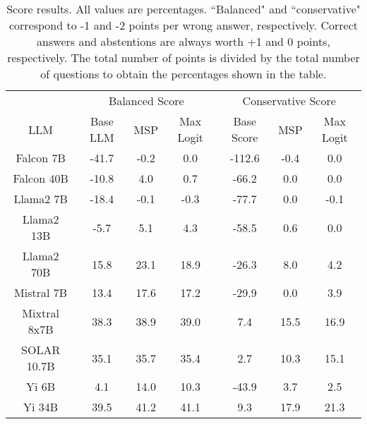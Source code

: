 \renewcommand\arraystretch{1.2}
\begin{table*}
\centering
\begin{tabular}{c|c|c|c|c|c|c}
& \multicolumn{3}{c|}{Balanced Score} & \multicolumn{3}{c}{Conservative Score} \\ 
LLM & Base LLM & MSP & Max Logit & Base Score & MSP & Max Logit\\ \hline
Falcon 7B & -41.7 & -0.2 & 0.0 & -112.6 & -0.4 & 0.0\\
Falcon 40B & -10.8 & 4.0 & 0.7 & -66.2 & 0.0 & 0.0\\
Llama2 7B & -18.4 & -0.1 & -0.3 & -77.7 & 0.0 & -0.1\\
Llama2 13B & -5.7 & 5.1 & 4.3 & -58.5 & 0.6 & 0.0\\
Llama2 70B & 15.8 & 23.1 & 18.9 & -26.3 & 8.0 & 4.2\\
Mistral 7B & 13.4 & 17.6 & 17.2 & -29.9 & 0.0 & 3.9\\
Mixtral 8x7B & 38.3 & 38.9 & 39.0 & 7.4 & 15.5 & 16.9\\
SOLAR 10.7B & 35.1 & 35.7 & 35.4 & 2.7 & 10.3 & 15.1\\
Yi 6B & 4.1 & 14.0 & 10.3 & -43.9 & 3.7 & 2.5\\
Yi 34B & 39.5 & 41.2 & 41.1 & 9.3 & 17.9 & 21.3\\
\hline
\end{tabular}
\caption{Score results. All values are percentages. ``Balanced" and ``conservative" correspond to -1 and -2 points per wrong answer, respectively. Correct answers and abstentions are always worth +1 and 0 points, respectively. The total number of points is divided by the total number of questions to obtain the percentages shown in the table.}
\label{tab:score}
\end{table*}
